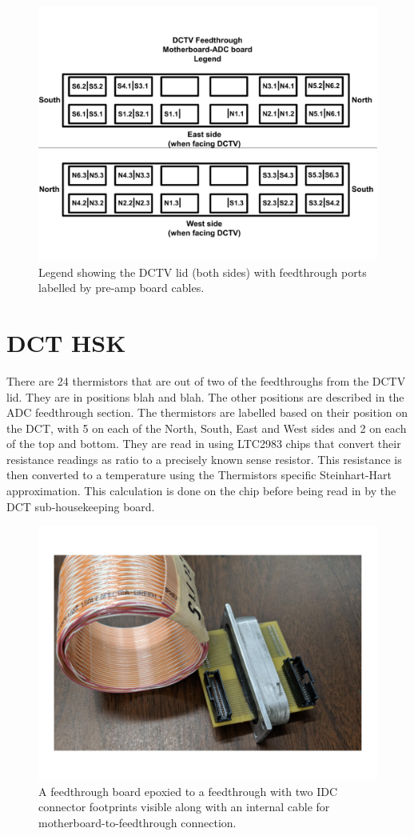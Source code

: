 \documentclass[12pt]{article}
\begin{document}
\begin{figure}
  \centering
  \includegraphics[scale=0.25]{DCT_feedthrough_legend.png}
  \caption{Legend showing the DCTV lid (both sides) with feedthrough ports labelled by pre-amp board cables.}
  \label{fig:legend}
\end{figure}


\section{DCT HSK}

There are 24 thermistors that are out of two of the feedthroughs from the DCTV lid. They are in positions blah and blah. %
The other positions are described in the ADC feedthrough section. The thermistors are labelled based on their position on the DCT, with 5 on each of the North, South, East and West sides and 2 on each of the top and bottom. They are read in using LTC2983 chips that convert their resistance readings as ratio to a precisely known sense resistor. This resistance is then converted to a temperature using the Thermistors specific Steinhart-Hart approximation. This calculation is done on the chip before being read in by the DCT sub-housekeeping board.


\begin{figure}
  \includegraphics[scale=0.2]{DCT_feedthrough.png}
  \caption{A feedthrough board epoxied to a feedthrough with two IDC connector footprints visible along with an internal cable for motherboard-to-feedthrough connection.}
  \label{fig:board}
\end{figure}
\end{document}
